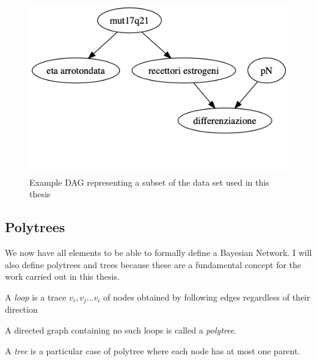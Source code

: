 \begin{figure}[htbp]
\centerline{\includegraphics[width=\columnwidth]{mathematical-background/images/bn-example-structure}}
\caption{Example DAG representing a subset of the data set used in this thesis}
\label{fig:bn-example-dag}
\end{figure}

\subsection{Polytrees} \label{subsec:polytrees}
We now have all elements to be able to formally define a Bayesian Network.
I will also define polytrees and trees because these are a fundamental concept for the work carried out in this thesis.
\begin{definition}
	A \textit{loop} is a trace $v_i, v_j \ldots v_i$ of nodes obtained by following edges regardless of their direction
\end{definition}
\begin{definition}
	A directed graph containing no such loops is called a \textit{polytree}. 
\end{definition}
\begin{definition}
	A \textit{tree} is a particular case of polytree where each node has at most one parent.	
\end{definition}

